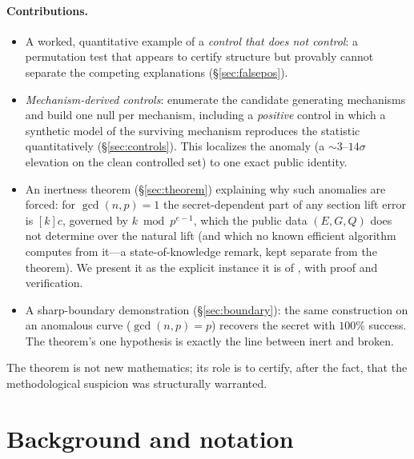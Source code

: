 \documentclass[11pt]{article}
\theoremstyle{definition}
\begin{document}
\paragraph{Contributions.}
\begin{itemize}
\item A worked, quantitative example of a \emph{control that does not
control}: a permutation test that appears to certify structure but
provably cannot separate the competing explanations
(\S\ref{sec:falsepos}).
\item \emph{Mechanism-derived controls}: enumerate the candidate
generating mechanisms and build one null per mechanism, including a
\emph{positive} control in which a synthetic model of the surviving
mechanism reproduces the statistic quantitatively
(\S\ref{sec:controls}). This localizes the anomaly (a $\sim$$3$--$14\sigma$
elevation on the clean controlled set) to one exact public identity.
\item An inertness theorem (\S\ref{sec:theorem}) explaining why such
anomalies are forced: for $\gcd(n,p)=1$ the secret-dependent part of any
section lift error is $[k]c$, governed by $k \bmod p^{e-1}$, which the
public data $(E,G,Q)$ does not determine over the natural lift (and which
no known efficient algorithm computes from it---a state-of-knowledge
remark, kept separate from the theorem). We present it as the explicit
instance it is of \cite{silvermanlift,gadiyarpadma}, with proof and
verification.
\item A sharp-boundary demonstration (\S\ref{sec:boundary}): the same
construction on an anomalous curve ($\gcd(n,p)=p$) recovers the secret
with $100\%$ success. The theorem's one hypothesis is exactly the line
between inert and broken.
\end{itemize}

The theorem is not new mathematics; its role is to certify, after the
fact, that the methodological suspicion was structurally warranted.

\section{Background and notation}\label{sec:background}
\end{document}
